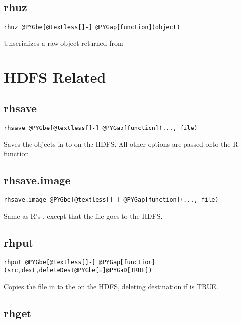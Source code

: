 \documentclass[letterpaper,10pt,english]{manual}
\begin{document}
\subsection{rhuz}

\begin{Verbatim}[commandchars=@\[\]]
rhuz @PYGbe[@textless[]-] @PYGap[function](object)
\end{Verbatim}

Unserializes a raw object returned from 


\section{HDFS Related}


\subsection{rhsave}

\begin{Verbatim}[commandchars=@\[\]]
rhsave @PYGbe[@textless[]-] @PYGap[function](..., file)
\end{Verbatim}

Saves the objects in  to  on the HDFS. All other options are
passed onto the R function 


\subsection{rhsave.image}

\begin{Verbatim}[commandchars=@\[\]]
rhsave.image @PYGbe[@textless[]-] @PYGap[function](..., file)
\end{Verbatim}

Same as R's , except that the file goes to the HDFS.


\subsection{rhput}

\begin{Verbatim}[commandchars=@\[\]]
rhput @PYGbe[@textless[]-] @PYGap[function](src,dest,deleteDest@PYGbe[=]@PYGaD[TRUE])
\end{Verbatim}

Copies the file in  to the  on the HDFS, deleting destination if
 is TRUE.


\subsection{rhget}
\end{document}

